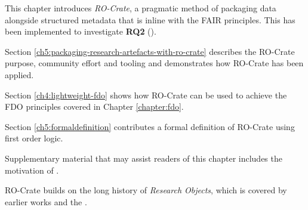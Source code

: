 This chapter introduces \emph{RO-Crate}, a pragmatic method of packaging data alongside structured metadata that is inline with the FAIR principles. This has been implemented to investigate \textbf{RQ2} (). 

Section \vref{ch5:packaging-research-artefacts-with-ro-crate} describes the \acrshort{RO-Crate} purpose,  community effort and tooling and demonstrates how RO-Crate has been applied.

Section \vref{ch4:lightweight-fdo} shows how RO-Crate can be used to achieve the FDO principles covered in Chapter \ref{chapter:fdo}.

Section \vref{ch5:formaldefinition} contributes a formal definition of RO-Crate using first order logic.

Supplementary material that may assist readers of this chapter includes the motivation of   \cite{Ó Carragáin 2019b}. 

RO-Crate builds on the long history of \emph{Research Objects}, which is covered by earlier works  \cite{Bechhofer 2013,Belhajjame 2015,Goble 2018} and the .
